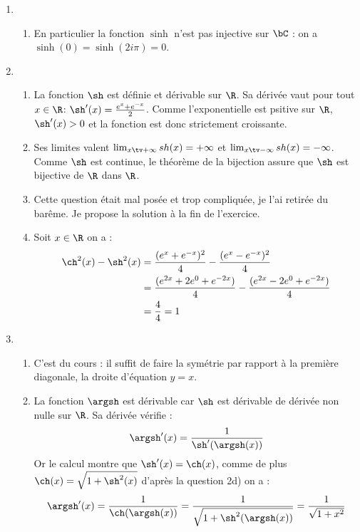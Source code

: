 \begin{correction}
\begin{enumerate}
\item 
\begin{enumerate}
Soit $z$ un imaginaire pur, il existe donc $\theta \in \R$ tel que $z=i\theta$. On a alors 
$\sinh(z) = \sinh(i\theta) = \frac{e^{i\theta}  - e^{-i\theta} }{2} = i\sin(\theta)$ d'après les formules d'Euler. 
\item En particulier la fonction $\sinh$ n'est pas injective sur $\bC$ : on  a  
$\sinh(0 ) = \sinh(2i\pi)=0$. 


\end{enumerate}
\item 
\begin{enumerate}
\item  La fonction $\sh$ est définie et dérivable sur $\R$. Sa dérivée vaut pour tout $x\in \R$:  $\sh'(x) =\frac{e^x+e^{-x}}{2}$. Comme l'exponentielle est psitive sur $\R$, $\sh'(x)>0$ et la fonction est donc strictement croissante. 
\item Ses limites valent $ \lim_{x\tv +\infty} sh(x)= +\infty$ et $ \lim_{x\tv -\infty} sh(x)= -\infty$. Comme $\sh$  est continue, le théorème de la bijection assure que $\sh$ est bijective de $\R$ dans $\R$. 

\item Cette question était mal posée et trop compliquée, je l'ai retirée du barême. Je propose la solution à la fin de l'exercice. 

\item Soit $x\in \R$ on a :
\begin{align*}
\ch^2(x)-\sh^2(x)&= \frac{(e^x+e^{-x})^2}{4}-\frac{(e^x-e^{-x})^2}{4}\\
							&= \frac{(e^{2x}+2e^0+e^{-2x})}{4}-\frac{(e^{2x}-2e^0 +e^{-2x})}{4}\\
					&= \frac{4}{4}=1
\end{align*}

\end{enumerate}
\item 
\begin{enumerate}
\item C'est du cours : il suffit de faire la symétrie par rapport à la première diagonale, la droite d'équation $y=x$. 
\item La fonction $\argsh$ est dérivable car $\sh$ est dérivable de dérivée non nulle sur $\R$. Sa dérivée vérifie  : 
$$\argsh'(x) = \frac{1}{\sh'(\argsh(x))}$$
Or le calcul montre que $\sh'(x) = \ch(x) $,  comme de plus $\ch (x)= \sqrt{1+\sh^2(x)}$ d'après la question 2d) on  a : 
$$\argsh'(x) = \frac{1}{\ch(\argsh(x))} = \frac{1 }{\sqrt{1+\sh^2(\argsh(x))}}= \frac{1}{\sqrt{1+x^2}}$$





\end{enumerate}
\end{enumerate}
\end{correction}

